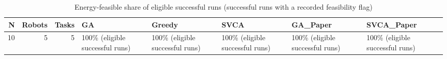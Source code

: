 \begin{table}[htbp]
\centering
\small
\caption{Energy-feasible share of eligible successful runs (successful runs with a recorded feasibility flag)}
\label{tab:research_smoke_c1_r1_20261122_energy_feasibility}
\begin{tabular}{rrrlllll}
\hline
N & Robots & Tasks & GA & Greedy & SVCA & GA\_Paper & SVCA\_Paper \\
\hline
10 & 5 & 5 & 100\% (eligible successful runs) & 100\% (eligible successful runs) & 100\% (eligible successful runs) & 100\% (eligible successful runs) & 100\% (eligible successful runs) \\
\hline
\end{tabular}
\end{table}
